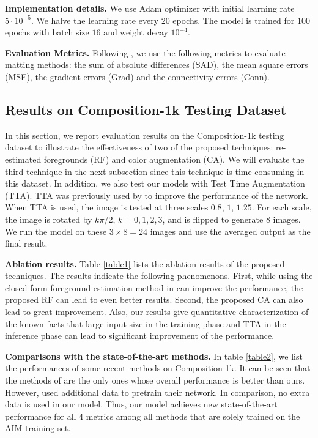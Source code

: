 \documentclass{article}
\theoremstyle{plain}
\begin{document}
\textbf{Implementation details.}
We use Adam optimizer \cite{Kingma2015Adam}
with initial learning rate $5\cdot 10^{-5}$.
We halve the learning rate every $20$ epochs.
The model is trained for $100$ epochs with
batch size $16$
and weight decay $10^{-4}$.


\textbf{Evaluation Metrics.}
Following \cite{Xu2017DeepImageMatting,Houjj2019ContextAwareImageMatting}, we use the following metrics to evaluate matting methods:
the sum of absolute differences (SAD), the mean square errors (MSE), the gradient errors (Grad) and the connectivity errors (Conn).




\subsection{Results on Composition-1k Testing Dataset}
In this section, we report evaluation results on the Composition-1k testing dataset \cite{Xu2017DeepImageMatting}
to illustrate the effectiveness
of two of the proposed techniques: re-estimated foregrounds (RF) and color augmentation (CA).
We will evaluate the third technique in the next subsection since this technique is time-consuming in this dataset.
In addition,
we also test our models with Test Time Augmentation (TTA).
TTA was previously used by \cite{Tang2019Learning-Based,Forte2020FBA} to improve the performance of the network.
When TTA is used, the image is tested at three scales $0.8$, $1$, $1.25$.
For each scale, the image is rotated by $k\pi / 2$, $k  =0, 1, 2, 3$, and is flipped to generate $8$ images.
We run the model on these $3 \times 8 = 24$ images and use the averaged output as the final result.




\textbf{Ablation results.}
Table \ref{table1} lists the ablation results of the proposed techniques.
The results indicate the following phenomenons.
First,
while using the closed-form foreground estimation method in \cite{Levin2008AClosed-Form}
can improve the performance,
the proposed RF can lead to even better results.
Second,
the proposed CA can also lead to great improvement.
Also,
our results give quantitative characterization of the known facts
that
large input size in the training phase and TTA in the inference phase can lead to 
significant improvement of the performance.



\textbf{Comparisons with the state-of-the-art methods.}
In table \ref{table2}, we list the performances of some recent methods on Composition-1k.
It can be seen that 
the methods of \cite{Liu2021Long-RangeFeaturePropagating}
are the only ones whose overall performance is better than ours.
However, 
\cite{Liu2021Long-RangeFeaturePropagating} used additional data to pretrain their network.
In comparison, no extra data is used in our model.
Thus, our model achieves new state-of-the-art performance for all $4$ metrics among all methods that are solely trained on the AIM training set.
\end{document}
